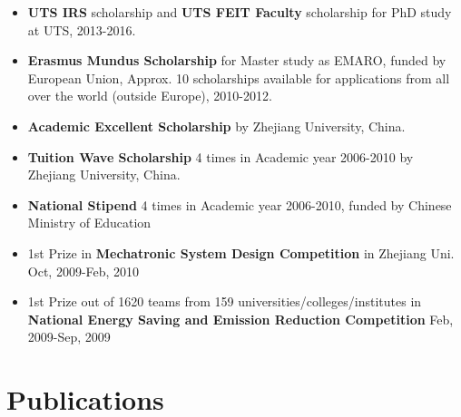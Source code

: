 \documentclass[margin,line]{res}
\begin{document}
\begin{resume}
\begin{itemize}
\item {\bf UTS IRS} %
scholarship and {\bf UTS FEIT Faculty} scholarship for PhD study at UTS, 2013-2016.

%
\vspace*{-2.5mm}
\item {\bf Erasmus Mundus Scholarship} for Master study as EMARO, funded by European Union, Approx. 10 scholarships available for applications from all over the world (outside Europe), 2010-2012.

\vspace*{-2.5mm}
\item {\bf Academic Excellent Scholarship} by Zhejiang University, China.

\vspace*{-2.5mm}
\item {\bf Tuition Wave Scholarship} 4 times in Academic year 2006-2010 by Zhejiang University, China.

\vspace*{-2.5mm}
\item {\bf National Stipend} 4 times in Academic year 2006-2010, funded by Chinese Ministry of Education

\vspace*{-2.5mm}
\item 1st Prize in {\bf Mechatronic System Design Competition} in Zhejiang Uni. Oct, 2009-Feb, 2010

\vspace*{-2.5mm}
\item 1st Prize out of 1620 teams from 159 universities/colleges/institutes in {\bf National Energy Saving and Emission Reduction Competition} Feb, 2009-Sep, 2009


\end{itemize}



\section{\sc Publications}
%
%
\begin{enumerate}


\end{enumerate}
\end{resume}
\end{document}
